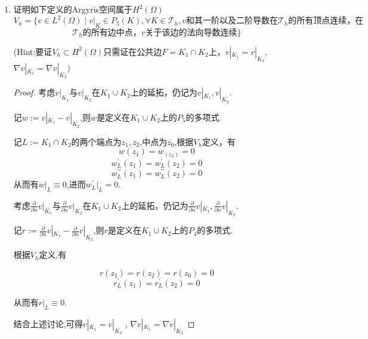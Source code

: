 \documentclass[12pt,a4paper]{article}
\begin{document}
\begin{enumerate}
		(Hint:要证$V_h\subset H^1(\Omega)$只需证在公共边$F=K_1\cap K_2$上，$v|_{K_1}=v|_{K_2})$
		
		\begin{proof}
			考虑$v|_{K_1}$与$v|_{K_2}$在$K_1\cup K_2$上的延拓，仍记为$v|_{K_1},v|_{K_2}$.
			
			记$w := v|_{K_1}-v|_{K_2}$,则$w$是定义在$K_1\cup K_2$上的$P_3$的多项式.
			
			记$L := K_1\cap K_2$的两个端点为$z_1,z_2$,根据$V_h$定义，有
			$$
			w(z_1)=w_(z_2)=0
			$$
			$$
			w_{L}^{\prime}(z_1)=w_{L}^{\prime}(z_2)=0
			$$
			从而有$w|_{L}\equiv0$. 即$v|_{K_1}=v|_{K_2}$
		\end{proof}
		
		\item 证明如下定义的Argyris空间属于$H^2(\Omega)$ 
		$$V_h=\{v\in L^2(\Omega)\mid v|_K\in P_5(K),\forall K\in \mathcal{T}_h,v\text{和其一阶以及二阶导数在}\mathcal{T}_h
		\text{的所有顶点连续，在}$$
		$$\mathcal{T}_h\text{的所有边中点，}v\text{关于该边的法向导数连续}\}$$
		
		(Hint:要证$V_h\subset H^2(\Omega)$只需证在公共边$F=K_1\cap K_2$上，$v|_{K_1}=v|_{K_2}$, $\nabla v|_{K_1}=\nabla v|_{K_2})$
		
		\begin{proof}
			考虑$v|_{K_1}$与$v|_{K_2}$在$K_1\cup K_2$上的延拓，仍记为$v|_{K_1},v|_{K_2}$.
			
			记$w := v|_{K_1}-v|_{K_2}$,则$w$是定义在$K_1\cup K_2$上的$P_5$的多项式.
			
			记$L := K_1\cap K_2$的两个端点为$z_1,z_2$,中点为$z_0$,根据$V_h$定义，有
			$$
			w(z_1)=w_(z_2)=0
			$$
			$$
			w_{L}^{\prime}(z_1)=w_{L}^{\prime}(z_2)=0
			$$
			$$
			w_{L}^{\prime\prime}(z_1)=w_{L}^{\prime\prime}(z_2)=0
			$$
			从而有$w|_{L}\equiv0$,进而$w_L^\prime|_L=0$.
			
			考虑$\frac{\partial}{\partial n} v|_{K_1}$与$\frac{\partial}{\partial n} v|_{K_2}$在$K_1\cup K_2$上的延拓，仍记为$\frac{\partial}{\partial n} v|_{K_1},\frac{\partial}{\partial n} v|_{K_2}$.
			
			记$r:=\frac{\partial}{\partial n} v|_{K_1}-\frac{\partial}{\partial n} v|_{K_2}$,则$r$是定义在$K_1\cup K_2$上的$P_4$的多项式.
			
			根据$V_h$定义,有
			
			$$r(z_1)=r(z_2)=r(z_0)=0$$
			$$r_L^\prime(z_1)=r_L^\prime(z_2)=0$$
			
			从而有$r|_{L}\equiv0$.
			
			结合上述讨论,可得$v|_{K_1}=v|_{K_2}$ , $\nabla v|_{K_1}=\nabla v|_{K_2}$
		\end{proof}
	\end{enumerate}
	
\end{document}
